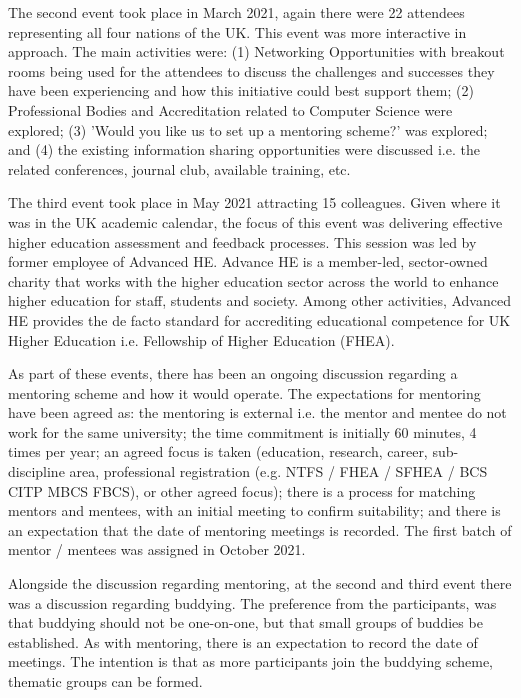 \documentclass[sigconf]{acmart}
\begin{document}
The second event took place in March 2021, again there were 22 attendees representing all four nations of the UK. This event was more interactive in approach. The main activities were: (1) Networking Opportunities with breakout rooms being used for the attendees to discuss the challenges and successes they have been experiencing and how this initiative could best support them; (2) Professional Bodies and Accreditation related to Computer Science were explored; (3) 'Would you like us to set up a mentoring scheme?' was explored; and (4) the existing information sharing opportunities were discussed i.e. the related conferences, journal club, available training, etc. 

The third event took place in May 2021 attracting 15 colleagues. Given where it was in the UK academic calendar, the focus of this event was delivering effective higher education assessment and feedback processes. This session was led by former employee of Advanced HE. Advance HE is a member-led, sector-owned charity that works with the higher education sector across the world to enhance higher education for staff, students and society. Among other activities, Advanced HE provides the de facto standard for accrediting educational competence for UK Higher Education i.e. Fellowship of Higher Education (FHEA).

As part of these events, there has been an ongoing discussion regarding a mentoring scheme and how it would operate. The expectations for mentoring have been agreed as: the mentoring is external i.e. the mentor and mentee do not work for the same university; the time commitment is initially 60 minutes, 4 times per year; an agreed focus is taken (education, research, career, sub-discipline area, professional registration (e.g. NTFS / FHEA / SFHEA / BCS CITP MBCS FBCS), or other agreed focus); there is a process for matching mentors and mentees, with an initial meeting to confirm suitability; and there is an expectation that the date of mentoring meetings is recorded. The first batch of mentor / mentees was assigned in October 2021. 

Alongside the discussion regarding mentoring, at the second and third event there was a discussion regarding buddying. The preference from the participants, was that buddying should not be one-on-one, but that small groups of buddies be established. As with mentoring, there is an expectation to record the date of meetings. The intention is that as more participants join the buddying scheme, thematic groups can be formed. 
\end{document}
